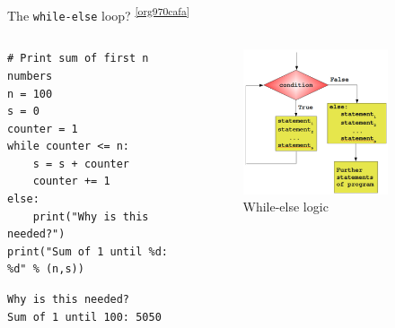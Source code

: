 \documentclass[presentation]{beamer}
\begin{document}
\begin{frame}[label={sec:org8195ef3},fragile]{The \texttt{while-else} loop? \textsuperscript{\cref{org970cafa}}}
 \begin{columns}
\begin{column}{0.48\columnwidth}
\scriptsize
\begin{verbatim}
# Print sum of first n numbers
n = 100
s = 0
counter = 1
while counter <= n:
    s = s + counter
    counter += 1
else:
    print("Why is this needed?")
print("Sum of 1 until %d: %d" % (n,s))
\end{verbatim}

\begin{verbatim}
Why is this needed?
Sum of 1 until 100: 5050
\end{verbatim}
\end{column}

\begin{column}{0.45\columnwidth}
\footnotesize
\begin{figure}[htbp]
\centering
\includegraphics[width=0.8\textwidth]{images/while_loop_with_else.png}
\caption{While-else logic}
\end{figure}
\end{column}
\end{columns}

\end{frame}
\end{document}
